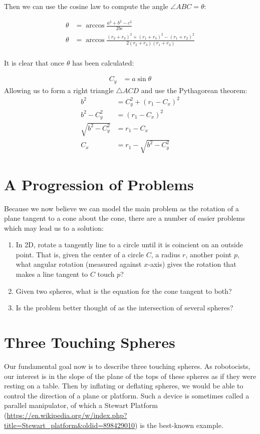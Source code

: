\documentclass{article}
\begin{document}
Then we can use the cosine law to compute the angle $\angle ABC = \theta$:


\begin{align}
  \theta  &= \arccos{\frac{a^2 + b^2 - c^2}{2bc}} \\
  \theta  &= \arccos{\frac{(r_2+r_3)^2 + (r_1+r_3)^2 - (r_1+r_2)^2}{2(r_2+r_3)(r_1+r_3)}} \\
\end{align}

It is clear that once $\theta$ has been calculated:

\begin{align}
 C_y  &= a\sin{\theta}
\end{align}
Allowing us to form a right triangle $\triangle ACD$ and use the Pythagorean theorem:
\begin{align}
  b^2  &= C_y^2 + (r_1-C_x)^2 \\
  b^2 - C_y^2  &= (r_1-C_x)^2  \\
  \sqrt{b^2 - C_y^2}  &= r_1-C_x  \\
  C_x &= r_1 -  \sqrt{b^2 - C_y^2}
\end{align}

\section{A Progression of Problems}

Because we now believe we can model the main problem as the rotation of a plane tangent to a cone about the cone,
there are a number of easier problems which may lead us to a solution:
\begin{enumerate}
\item In 2D, rotate a tangently line to a circle until it is coincient on an outside point.  That is, given the
  center of a circle $C$, a radius $r$, another point $p$, what angular rotation (measured against $x$-axis) gives
  the rotation that makes a line tangent to $C$ touch $p$?
\item Given two spheres, what is the equation for the cone tangent to both?
  \item Is the problem better thought of as the intersection of several spheres?
  \end{enumerate}

\section{Three Touching Spheres}

Our fundamental goal now is to describe three touching spheres. As robotocists,
our interest is in the slope of the plane of the tops of these spheres
as if they were resting on a table. Then by inflating or deflating spheres,
we would be able to control the direction of a plane or platform.
Such a device is sometimes called a parallel manipulator, of which a
Stewart Platform\cite{wiki:stewart} (\url{https://en.wikipedia.org/w/index.php?title=Stewart_platform&oldid=898429010})
is the best-known example.
\end{document}
